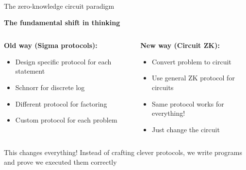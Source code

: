 \documentclass[aspectratio=169, lualatex, handout]{beamer}
\begin{document}
\begin{frame}{The zero-knowledge circuit paradigm}
	\begin{center}
		\textbf{The fundamental shift in thinking}
	\end{center}
	\vspace{0.5em}
	\begin{columns}[c]
		\begin{column}{0.5\textwidth}
			\textbf{Old way (Sigma protocols):}
			\begin{itemize}
				\item Design specific protocol for each statement
				\item Schnorr for discrete log
				\item Different protocol for factoring
				\item Custom protocol for each problem
			\end{itemize}
		\end{column}
		\begin{column}{0.5\textwidth}
			\textbf{New way (Circuit ZK):}
			\begin{itemize}
				\item Convert problem to circuit
				\item Use general ZK protocol for circuits
				\item Same protocol works for everything!
				\item Just change the circuit
			\end{itemize}
		\end{column}
	\end{columns}
	\vspace{0.5em}
	\begin{alertblock}{This changes everything!}
		Instead of crafting clever protocols, we write programs and prove we executed them correctly
	\end{alertblock}
\end{frame}
\end{document}
